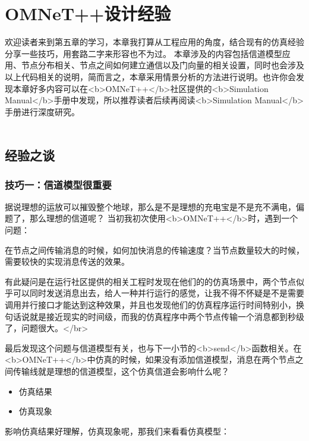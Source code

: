 \chapter{OMNeT++设计经验}

\begin{summary}
欢迎读者来到第五章的学习，本章我打算从工程应用的角度，结合现有的仿真经验分享一些技巧，用套路二字来形容也不为过。
本章涉及的内容包括信道模型应用、节点分布相关、节点之间如何建立通信以及门向量的相关设置，同时也会涉及以上代码相关的说明，简而言之，本章采用情景分析的方法进行说明。也许你会发现本章好多内容可以在<b>OMNeT++</b>社区提供的<b>Simulation Manual</b>手册中发现，所以推荐读者后续再阅读<b>Simulation Manual</b>手册进行深度研究。\\ \\
\end{summary}

\section{经验之谈}
\subsection{技巧一：信道模型很重要}
据说理想的运放可以摧毁整个地球，那么是不是理想的充电宝是不是充不满电，偏题了，那么理想的信道呢？
当初我初次使用<b>OMNeT++</b>时，遇到一个问题：

\begin{remark}
在节点之间传输消息的时候，如何加快消息的传输速度？当节点数量较大的时候，需要较快的实现消息传送的效果。
\end{remark}

有此疑问是在运行社区提供的相关工程时发现在他们的的仿真场景中，两个节点似乎可以同时发送消息出去，给人一种并行运行的感觉，让我不得不怀疑是不是需要调用并行接口才能达到这种效果，并且也发现他们的仿真程序运行时间特别小，换句话说就是接近现实的时间级，而我的仿真程序中两个节点传输一个消息都到秒级了，问题很大。</br>

最后发现这个问题与信道模型有关，也与下一小节的<b>send</b>函数相关。在<b>OMNeT++</b>中仿真的时候，如果没有添加信道模型，消息在两个节点之间传输线就是理想的信道模型，这个仿真信道会影响什么呢？\\


\begin{itemize}
	\item 仿真结果
	\item 仿真现象
\end{itemize}

影响仿真结果好理解，仿真现象呢，那我们来看看仿真模型：


